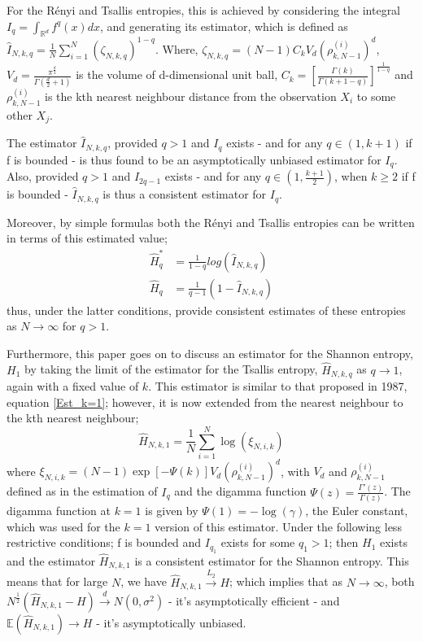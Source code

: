 \documentclass{report}
\begin{document}
For the R\'enyi and Tsallis entropies, this is achieved by considering the integral  $I_{q} = \int_{\mathbb{R}^d} f^q (x) dx$, and generating its estimator, which is defined as $\hat{I}_{N, k, q} = \frac{1}{N} \sum_{i=1}^{N} (\zeta_{N, k, q})^{1-q}$. Where, $\zeta_{N, k ,q} = (N-1)C_{k}V_{d}(\rho_{k, N-1}^{(i)})^d$,  $V_{d} = \frac{\pi^{\frac{d}{2}}}{\Gamma(\frac{d}{2} + 1 )}$ is the volume of d-dimensional unit ball, $C_{k} = \left[ \frac{\Gamma(k)}{\Gamma(k+1-q)} \right]^{\frac{1}{1-q}}$ and $\rho_{k, N-1}^{(i)}$ is the kth nearest neighbour distance from the observation $X_{i}$ to some other $X_{j}$.

The estimator $\hat{I}_{N, k, q}$, provided $q>1$ and $I_{q}$ exists - and for any $q \in (1, k+1)$ if f is bounded - is thus found to be an asymptotically unbiased estimator for $I_{q}$. Also, provided  $q>1$ and $I_{2q-1}$ exists -  and for any $q \in (1, \frac{k+1}{2})$, when $k \geq 2$ if f is bounded - $\hat{I}_{N, k, q}$ is thus a consistent estimator for $I_{q}$.

Moreover, by simple formulas both the R\'enyi and Tsallis entropies can be written in terms of this estimated value; 
\begin{align}
\hat{H}_{q}^{*} &= \frac{1}{1-q} log(\hat{I}_{N, k, q}) \\
\hat{H}_{q} &= \frac{1}{q-1} (1 - \hat{I}_{N, k, q})
\end{align}
thus, under the latter conditions, provide consistent estimates of these entropies as $N \to \infty$ for $q > 1$.

Furthermore, this paper goes on to discuss an estimator for the Shannon entropy, $H_{1}$ by taking the limit of the estimator for the Tsallis entropy, $\hat{H}_{N, k, q}$ as $q \to 1$, again with a fixed value of $k$. This estimator is similar to that proposed in 1987, equation \ref{Est_k=1}; however, it is now extended from the nearest neighbour to the kth nearest neighbour;
\begin{equation}
\hat{H}_{N, k, 1} =  \frac{1}{N} \sum_{i=1}^{N} \log (\xi_{N, i, k})
\end{equation} 
where $\xi_{N, i, k} = (N-1)\exp[-\Psi(k)]V_{d}(\rho_{k, N-1}^{(i)})^{d}$, with $V_{d}$ and $\rho_{k, N-1}^{(i)}$ defined as in the estimation of $I_{q}$ and the digamma function $\Psi(z) = \frac{\Gamma'(z)}{\Gamma(z)}$. The digamma function at $k=1$ is given by $\Psi(1) = -\log(\gamma)$, the Euler constant, which was used for the $k=1$ version of this estimator. Under the following less restrictive conditions; f is bounded and $I_{q_{1}}$ exists for some $q_{1} > 1$; then $H_{1}$ exists and the estimator $\hat{H}_{N, k, 1}$ is a consistent estimator for the Shannon entropy. This means that for large $N$, we have $\hat{H}_{N, k, 1} \overset{L_{2}}{\to} H$; which implies that as $N \to \infty$, both $N^{\frac{1}{2}}(\hat{H}_{N, k, 1} - H) \overset{d}{\to} N(0, \sigma^2)$ - it's asymptotically efficient - and $\mathbb{E}(\hat{H}_{N, k, 1}) \to H$ - it's asymptotically unbiased.
\end{document}
